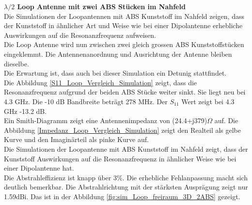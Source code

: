 \textbf{$\lambda/2$ Loop Antenne mit zwei ABS Stücken im Nahfeld}\\
Die Simulationen der Loopantennen mit ABS Kunststoff im Nahfeld zeigen, dass der Kunststoff in ähnlicher Art und Weise wie bei einer Dipolantenne erhebliche Auswirkungen auf die Resonanzfrequenz  aufweisen.\\

Die Loop Antenne wird nun zwischen zwei gleich grossen ABS Kunststoffstücken eingeklemmt. Die Antennenanordnung und Ausrichtung der Antenne bleiben dieselbe. \\
Die Erwartung ist, dass auch bei dieser Simulation ein Detunig stattfindet.\\ 

Die Abbildung \ref{S11_Loop_Vergleich_Simulation} zeigt, dass die Resonanzfrequenz aufgrund der beiden ABS Stücke weiter sinkt. Sie liegt neu bei 4.3 GHz. Die -10 dB Bandbreite beträgt 278 MHz. Der $S_{11}$ Wert zeigt bei 4.3 GHz -13.2 dB.\\
Ein Smith-Diagramm zeigt eine Antennenimpedanz von (24.4+j379)$\Omega$ auf. Die Abbildung \ref{Impedanz_Loop_Vergleich_Simulation} zeigt den Realteil als gelbe Kurve und den Imaginärteil als pinke Kurve auf. \\
Die Simulationen der Loopantenne mit ABS Kunststoff im Nahfeld zeigt, dass der Kunststoff Auswirkungen auf die Resonanzfrequenz in ähnlicher Weise wie bei einer Dipolantenne hat.\\
Die Abstrahleffizienz ist knapp über $3\%$. Die erhebliche Fehlanpassung macht sich deutlich bemerkbar. Die Abstrahlrichtung mit der stärksten Ausprägung zeigt nur 1.59dBi. Das ist in der Abbildung \ref{fig:sim_Loop_freiraum_3D_2ABS} gezeigt.
